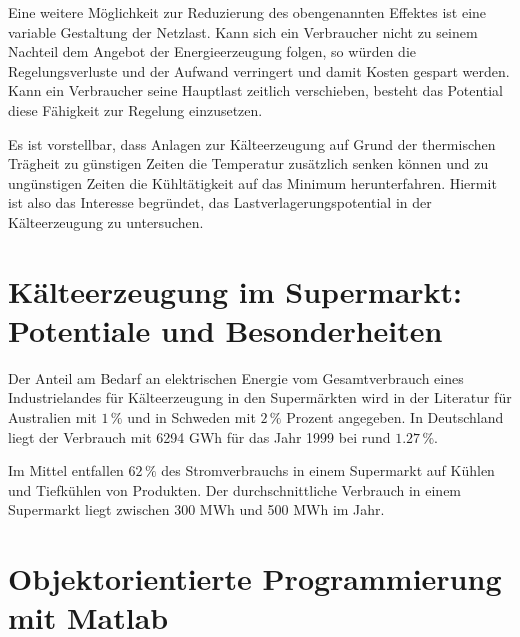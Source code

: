 Eine weitere M\"oglichkeit zur Reduzierung des obengenannten Effektes ist eine
variable Gestaltung der Netzlast. Kann sich ein Verbraucher nicht zu seinem
Nachteil dem Angebot der Energieerzeugung folgen, so würden die
Regelungsverluste und der Aufwand verringert und damit Kosten gespart werden.
Kann ein Verbraucher seine Hauptlast zeitlich verschieben, besteht das Potential
diese F\"ahigkeit zur Regelung einzusetzen.

Es ist vorstellbar, dass Anlagen zur K\"alteerzeugung auf Grund der thermischen
Tr\"agheit zu g\"unstigen Zeiten die Temperatur zus\"atzlich senken k\"onnen und
zu ung\"unstigen Zeiten die K\"uhlt\"atigkeit auf das Minimum herunterfahren.
Hiermit ist also das Interesse begr\"undet, das Lastverlagerungspotential in der
K\"alteerzeugung zu untersuchen.


\section{K\"alteerzeugung im Supermarkt: Potentiale und Besonderheiten}

Der Anteil am Bedarf an elektrischen Energie vom Gesamtverbrauch eines
Industrielandes für Kälteerzeugung in den Supermärkten wird in der Literatur
f\"ur  Australien mit $1\, \%$ \cite{australia} und in Schweden mit $2\, \%$
\cite{doctor, EANRW} Prozent angegeben. In Deutschland liegt der Verbrauch mit
6294 GWh f\"ur das Jahr 1999 bei rund $1.27\, \%$\cite{steilme}.

Im Mittel entfallen $62\, \%$ des Stromverbrauchs in einem Supermarkt
auf Kühlen und Tiefkühlen von Produkten. Der durchschnittliche Verbrauch in
einem Supermarkt liegt zwischen 300 MWh und 500 MWh im Jahr\cite{leghart}.



\section{Objektorientierte Programmierung mit Matlab}

